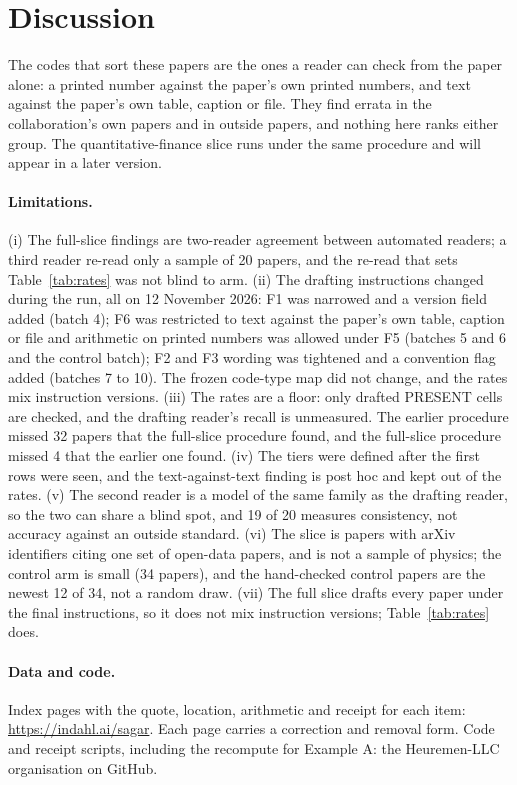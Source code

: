 \documentclass[reprint,amsmath,amssymb,aps,superscriptaddress,nofootinbib]{revtex4-2}
\begin{document}
\section{Discussion}

The codes that sort these papers are the ones a reader can check from the paper alone: a printed number against the paper's own printed numbers, and text against the paper's own table, caption or file. They find errata in the collaboration's own papers and in outside papers, and nothing here ranks either group. The quantitative-finance slice runs under the same procedure and will appear in a later version.

\paragraph*{Limitations.} (i) The full-slice findings are two-reader agreement between automated readers; a third reader re-read only a sample of 20 papers, and the re-read that sets Table~\ref{tab:rates} was not blind to arm. (ii) The drafting instructions changed during the run, all on 12 November 2026: F1 was narrowed and a version field added (batch 4); F6 was restricted to text against the paper's own table, caption or file and arithmetic on printed numbers was allowed under F5 (batches 5 and 6 and the control batch); F2 and F3 wording was tightened and a convention flag added (batches 7 to 10). The frozen code-type map did not change, and the rates mix instruction versions. (iii) The rates are a floor: only drafted PRESENT cells are checked, and the drafting reader's recall is unmeasured. The earlier procedure missed 32 papers that the full-slice procedure found, and the full-slice procedure missed 4 that the earlier one found. (iv) The tiers were defined after the first rows were seen, and the text-against-text finding is post hoc and kept out of the rates. (v) The second reader is a model of the same family as the drafting reader, so the two can share a blind spot, and 19 of 20 measures consistency, not accuracy against an outside standard. (vi) The slice is papers with arXiv identifiers citing one set of open-data papers, and is not a sample of physics; the control arm is small (34 papers), and the hand-checked control papers are the newest 12 of 34, not a random draw. (vii) The full slice drafts every paper under the final instructions, so it does not mix instruction versions; Table~\ref{tab:rates} does.

\paragraph*{Data and code.} Index pages with the quote, location, arithmetic and receipt for each item: \url{https://indahl.ai/sagar}. Each page carries a correction and removal form. Code and receipt scripts, including the recompute for Example A: the Heuremen-LLC organisation on GitHub.
\end{document}
